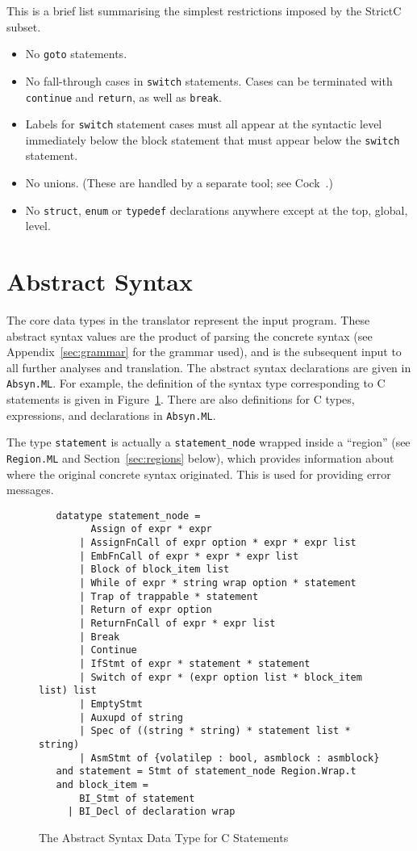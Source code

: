 \documentclass{article}
\newcommand{\strictc}{\textsf{StrictC}}
\newcommand{\MLsuffix}{.ML}
\newcommand{\srcfile}[1]{\texttt{#1}}
\newcommand{\MLfile}[1]{\srcfile{#1\MLsuffix}}
\begin{document}
This is a brief list summarising the simplest restrictions imposed by
the \strictc{} subset.
\begin{itemize}
\item No \texttt{goto} statements.
\item No fall-through cases in \texttt{switch} statements.  Cases can
  be terminated with \texttt{continue} and \texttt{return}, as well as
  \texttt{break}.
\item Labels for \texttt{switch} statement cases must all appear at
  the syntactic level immediately below the block statement that must
  appear below the \texttt{switch} statement.
\item No unions.  (These are handled by a separate tool; see
  Cock~\cite{Cock08}.)
\item No \texttt{struct}, \texttt{enum} or \texttt{typedef}
  declarations anywhere except at the top, global, level.
\end{itemize}

\section{Abstract Syntax}
\label{sec:abstract-syntax}

The core data types in the translator represent the input program.
These abstract syntax values are the product of parsing the concrete
syntax (see Appendix~\ref{sec:grammar} for the grammar used), and is
the subsequent input to all further analyses and translation.  The
abstract syntax declarations are given in \MLfile{Absyn}.  For
example, the definition of the syntax type corresponding to C
statements is given in Figure~\ref{fig:stmt-absyn}.  There are also
definitions for C types, expressions, and declarations in
\MLfile{Absyn}.

The type \texttt{statement} is actually a \texttt{statement_node}
wrapped inside a ``region'' (see \MLfile{Region} and
Section~\ref{sec:regions} below), which provides information about
where the original concrete syntax originated.  This is used for
providing error messages.
\begin{figure}[htbp]
\begin{verbatim}
   datatype statement_node =
         Assign of expr * expr
       | AssignFnCall of expr option * expr * expr list
       | EmbFnCall of expr * expr * expr list
       | Block of block_item list
       | While of expr * string wrap option * statement
       | Trap of trappable * statement
       | Return of expr option
       | ReturnFnCall of expr * expr list
       | Break
       | Continue
       | IfStmt of expr * statement * statement
       | Switch of expr * (expr option list * block_item list) list
       | EmptyStmt
       | Auxupd of string
       | Spec of ((string * string) * statement list * string)
       | AsmStmt of {volatilep : bool, asmblock : asmblock}
   and statement = Stmt of statement_node Region.Wrap.t
   and block_item =
       BI_Stmt of statement
     | BI_Decl of declaration wrap
\end{verbatim}
\caption{The Abstract Syntax Data Type for C Statements}
\label{fig:stmt-absyn}
\end{figure}
\end{document}
